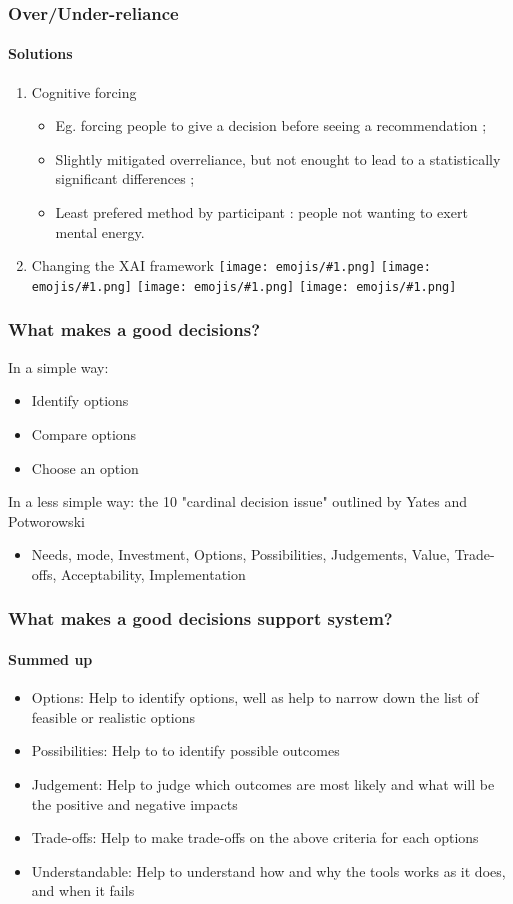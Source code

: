 \documentclass[compress,12pt]{beamer}
\newcommand{\emoji}[1]{\texttt{[image: emojis/\#1.png]}}
\begin{document}
\begin{frame}
      \frametitle{Over/Under-reliance}
      \framesubtitle{Solutions}
      \begin{enumerate}
            \item Cognitive forcing \begin{itemize}
                  \item Eg. forcing people to give a decision before seeing a recommendation ;
                  \item Slightly mitigated overreliance, but not enought to lead to a statistically significant differences ;
                  \item Least prefered method by participant : people not wanting to exert mental energy.
            \end{itemize}
            \item Changing the XAI framework \emoji{smirking-face} \emoji{thinking-face} \emoji{thought-balloon} \emoji{light-bulb}
      \end{enumerate}
\end{frame}

\begin{frame}
      \frametitle{What makes a good decisions?}
      In a simple way: \begin{itemize}
            \item Identify options
            \item Compare options
            \item Choose an option
      \end{itemize}
      In a less simple way: the 10 "cardinal decision issue" outlined by Yates and Potworowski \begin{itemize}
            \item Needs, mode, Investment, Options, Possibilities, Judgements, Value, Trade-offs, Acceptability, Implementation
      \end{itemize}
\end{frame}

\begin{frame}
      \frametitle{What makes a good decisions support system?}
      \framesubtitle{Summed up}
      \begin{itemize}
            \item Options: Help to identify options, well as help to narrow down the list of feasible or realistic options
            \item Possibilities: Help to to identify possible outcomes 
            \item Judgement: Help to judge which outcomes are most likely and what will be the positive and negative impacts
            \item Trade-offs: Help to make trade-offs on the above criteria for each options
            \item Understandable: Help to understand how and why the tools works as it does, and when it fails
      \end{itemize}
\end{frame}
\end{document}

